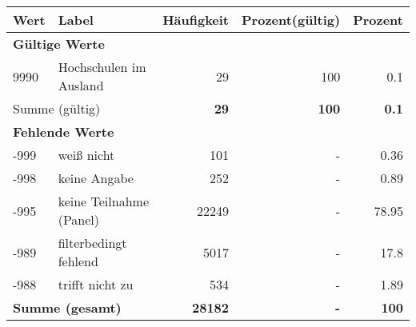      \begin{longtable}{lXrrr}
     \toprule
     \textbf{Wert} & \textbf{Label} & \textbf{Häufigkeit} & \textbf{Prozent(gültig)} & \textbf{Prozent} \\
     \endhead
     \midrule
     \multicolumn{5}{l}{\textbf{Gültige Werte}}\\

     9990 &
     \multicolumn{1}{X}{ Hochschulen im Ausland   } &


       \num{29} &
       \num[round-mode=places,round-precision=2]{100} &
         \num[round-mode=places,round-precision=2]{0,1} \\
     \midrule
     \multicolumn{2}{l}{Summe (gültig)} &
       \textbf{\num{29}} &
     \textbf{100} &
       \textbf{\num[round-mode=places,round-precision=2]{0,1}} \\
     \multicolumn{5}{l}{\textbf{Fehlende Werte}}\\
       -999 &
       weiß nicht &
         \num{101} &
        - &
         \num[round-mode=places,round-precision=2]{0,36} \\
       -998 &
       keine Angabe &
         \num{252} &
        - &
         \num[round-mode=places,round-precision=2]{0,89} \\
       -995 &
       keine Teilnahme (Panel) &
         \num{22249} &
        - &
         \num[round-mode=places,round-precision=2]{78,95} \\
       -989 &
       filterbedingt fehlend &
         \num{5017} &
        - &
         \num[round-mode=places,round-precision=2]{17,8} \\
       -988 &
       trifft nicht zu &
         \num{534} &
        - &
         \num[round-mode=places,round-precision=2]{1,89} \\
     \midrule
     \multicolumn{2}{l}{\textbf{Summe (gesamt)}} &
          \textbf{\num{28182}} &
        \textbf{-} &
        \textbf{100} \\
     \bottomrule
     \end{longtable}
     
